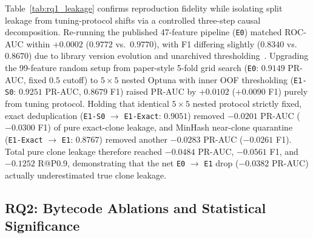 \documentclass[conference]{IEEEtran}
\begin{document}
Table~\ref{tab:rq1_leakage} confirms reproduction fidelity while isolating split leakage from tuning-protocol shifts via a controlled three-step causal decomposition. Re-running the published 47-feature pipeline (\texttt{E0}) matched ROC-AUC within $+0.0002$ ($0.9772$ vs.\ $0.9770$), with F1 differing slightly ($0.8340$ vs.\ $0.8670$) due to library version evolution and unarchived thresholding~\cite{pennella2025repo}. Upgrading the 99-feature random setup from paper-style 5-fold grid search (\texttt{E0}: $0.9149$ PR-AUC, fixed $0.5$ cutoff) to $5\times 5$ nested Optuna with inner OOF thresholding (\texttt{E1-S0}: $0.9251$ PR-AUC, $0.8679$ F1) raised PR-AUC by $+0.0102$ ($+0.0090$ F1) purely from tuning protocol. Holding that identical $5\times 5$ nested protocol strictly fixed, exact deduplication (\texttt{E1-S0} $\to$ \texttt{E1-Exact}: $0.9051$) removed $-0.0201$ PR-AUC ($-0.0300$ F1) of pure exact-clone leakage, and MinHash near-clone quarantine (\texttt{E1-Exact} $\to$ \texttt{E1}: $0.8767$) removed another $-0.0283$ PR-AUC ($-0.0261$ F1). Total pure clone leakage therefore reached $-0.0484$ PR-AUC, $-0.0561$ F1, and $-0.1252$ R@P0.9, demonstrating that the net \texttt{E0} $\to$ \texttt{E1} drop ($-0.0382$ PR-AUC) actually underestimated true clone leakage.

\subsection{RQ2: Bytecode Ablations and Statistical Significance}\label{sec:rq2}
\end{document}
